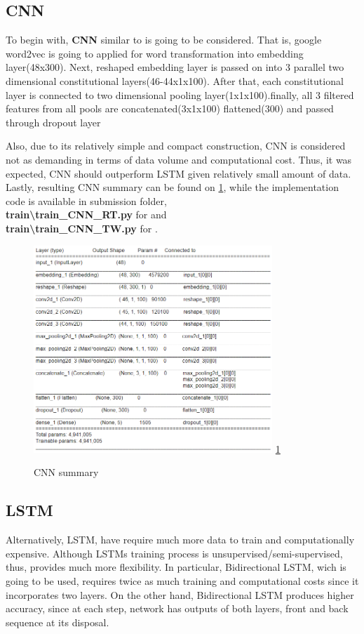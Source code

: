 \documentclass[conference]{IEEEtran}
\begin{document}
	\subsection{CNN}
		To begin with, \textbf{CNN} similar to \cite{CNN} is going to be considered. That is, google word2vec \cite{word2vec} is going to applied for word transformation into embedding layer(48x300). Next, reshaped embedding layer is passed on into 3 parallel two dimensional constitutional layers(46-44x1x100). After that, each constitutional layer is connected to two dimensional pooling layer(1x1x100).finally, all 3 filtered features from all pools are concatenated(3x1x100) flattened(300) and passed through dropout layer
		
		Also, due to its relatively simple and compact construction, CNN is considered not as demanding in terms of data volume and computational cost. Thus, it was expected, CNN should outperform LSTM given relatively small amount of data. Lastly, resulting CNN summary can be found on \ref{figure:cnn}, while the implementation code is available in submission folder, \textbf{\\train\textbackslash train\_CNN\_RT.py} for \RT and \textbf{\\train\textbackslash train\_CNN\_TW.py} for \TW.
		
		\begin{figure}
			\centering
			\includegraphics[width=9cm]{summary_cnn.png}
			\label{figure:cnn}
			\ref{figure:cnn}
			\caption{CNN summary}
		\end{figure}
	
	\subsection{LSTM}
	
		Alternatively, LSTM, have require much more data to train and computationally expensive.  Although LSTMs training process is unsupervised/semi-supervised, thus, provides much more flexibility. In particular, Bidirectional LSTM, wich is going to be used, requires twice as much training and computational costs since it incorporates two layers. On the other hand, Bidirectional LSTM produces higher accuracy, since at each step, network has outputs of both layers, front and back sequence at its disposal.
		
\end{document}
